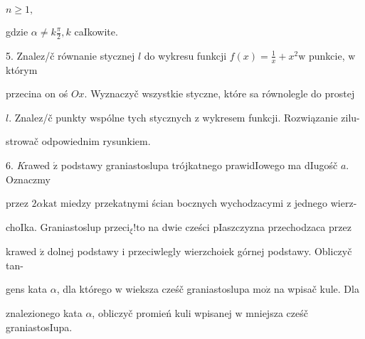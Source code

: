 \documentclass[a4paper,12pt]{article}
\begin{document}
$n\geq 1,$

gdzie $\displaystyle \alpha\neq k\frac{\pi}{2}, k$ caIkowite.

5. Znalez/č równanie stycznej $l$ do wykresu funkcji $f(x)=\displaystyle \frac{1}{x}+x^{2}\mathrm{w}$ punkcie, $\mathrm{w}$ którym

przecina on oś $Ox$. Wyznaczyč wszystkie styczne, które sa równolegle do prostej

$l$. Znalez/č punkty wspólne tych stycznych $\mathrm{z}$ wykresem funkcji. Rozwiązanie zilu-

strowač odpowiednim rysunkiem.

6. {\it K}rawed $\acute{\mathrm{z}}$ podstawy graniastoslupa trójkatnego prawidIowego ma dIugośč $a$. Oznaczmy

przez $ 2\alpha \mathrm{k}\mathrm{a}\mathrm{t}$ miedzy przekatnymi ścian bocznych wychodzacymi $\mathrm{z}$ jednego wierz-

choIka. Graniastoslup $\mathrm{p}\mathrm{r}\mathrm{z}\mathrm{e}\mathrm{c}\mathrm{i}_{\xi}!\mathrm{t}\mathrm{o}$ na dwie cześci pIaszczyzna przechodzaca przez

krawed $\acute{\mathrm{z}}$ dolnej podstawy $\mathrm{i}$ przeciwlegly wierzchoiek górnej podstawy. Obliczyč tan-

gens kata $\alpha$, dla którego $\mathrm{w}$ wieksza cześč graniastoslupa $\mathrm{m}\mathrm{o}\dot{\mathrm{z}}$ na wpisač kule. Dla

znalezionego kata $\alpha$, obliczyč promień kuli wpisanej $\mathrm{w}$ mniejsza cześč graniastosIupa.
\end{document}
